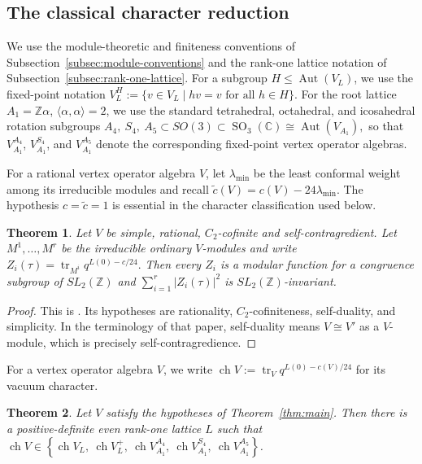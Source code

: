 \documentclass[10pt,a4paper]{amsart}
\numberwithin{equation}{section} \newtheorem{thm}{Theorem}[section] \newtheorem{lem}[thm]{Lemma} \newtheorem{ex}[thm]{Example} \newtheorem{prop}[thm]{Proposition} \newtheorem{cor}[thm]{Corollary} \newtheorem{defi}[thm]{Definition} \newtheorem{rmk}[thm]{Remark} \newtheorem{notation}[thm]{Notation}
\newcommand{\Aut}{\operatorname{Aut}}
\newcommand{\ch}{\operatorname{ch}}
\newcommand{\SO}{\operatorname{SO}}
\def\Z{\mathbb{Z}} \def\N{\mathbb{N}} \def\A{\mathbb{A}} \def\C{\mathbb{C}} \def\R{\mathbb{R}} \def\Q{\mathbb{Q}} \def\F{\mathbb{F}}
\begin{document}
\subsection{The classical character reduction}

We use the module-theoretic and finiteness conventions of Subsection~\ref{subsec:module-conventions} and the rank-one lattice notation of Subsection~\ref{subsec:rank-one-lattice}. For a subgroup $H\leq\Aut(V_L)$, we use the fixed-point notation \(V_L^H:=\{v\in V_L\mid hv=v\text{ for all }h\in H\}.\) For the root lattice $A_1=\Z\alpha$, $\langle\alpha,\alpha\rangle=2$, we use the standard tetrahedral, octahedral, and icosahedral rotation subgroups \(A_4,\ S_4,\ A_5\subset SO(3)\subset\SO_3(\C)\cong\Aut(V_{A_1}),\) so that $V_{A_1}^{A_4}$, $V_{A_1}^{S_4}$, and $V_{A_1}^{A_5}$ denote the corresponding fixed-point vertex operator algebras.

For a rational vertex operator algebra $V$, let $\lambda_{\min}$ be the least conformal weight among its irreducible modules and recall \(\widetilde c(V)=c(V)-24\lambda_{\min}.\) The hypothesis $c=\widetilde c=1$ is essential in the character classification used below.

\begin{thm}\label{thm:DJ-modularity}
Let $V$ be simple, rational, $C_2$-cofinite and self-contragredient. Let $M^1,\dots,M^r$ be the irreducible ordinary $V$-modules and write \(Z_i(\tau)=\operatorname{tr}_{M^i}q^{L(0)-c/24}.\) Then every $Z_i$ is a modular function for a congruence subgroup of $SL_2(\Z)$ and \(\sum_{i=1}^r|Z_i(\tau)|^2\) is $SL_2(\Z)$-invariant.
\end{thm}

\begin{proof}
This is \cite[Theorem~2.6]{DJA4}. Its hypotheses are rationality, $C_2$-cofiniteness, self-duality, and simplicity. In the terminology of that paper, self-duality means $V\cong V'$ as a $V$-module, which is precisely self-contragredience.
\end{proof}

For a vertex operator algebra $V$, we write \(\ch V:=\operatorname{tr}_V q^{L(0)-c(V)/24}\) for its vacuum character.

\begin{thm}\label{thm:character-reduction}
Let $V$ satisfy the hypotheses of Theorem~\ref{thm:main}. Then there is a positive-definite even rank-one lattice $L$ such that \(\ch V\in \left\{ \ch V_L,\ \ch V_L^+,\ \ch V_{A_1}^{A_4},\ \ch V_{A_1}^{S_4},\ \ch V_{A_1}^{A_5} \right\}\).
\end{thm}
\end{document}

